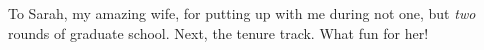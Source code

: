 

To Sarah, my amazing wife, for putting up with me during not one, but
{\it two} rounds of graduate school.  Next, the tenure track.  What
fun for her!


